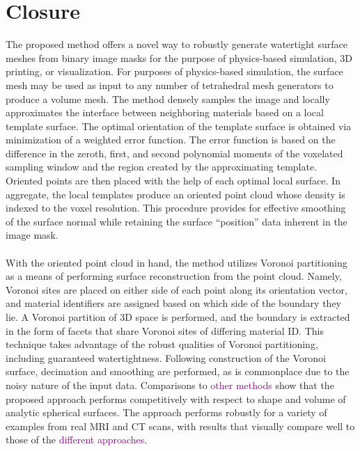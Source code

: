 \section{Closure}

The proposed method offers a novel way to robustly generate watertight surface meshes from binary image masks for the purpose of physics-based simulation, 3D printing, or visualization. For purposes of physics-based simulation, the surface mesh may be used as input to any number of tetrahedral mesh generators to produce a volume mesh. The method densely samples the image and locally approximates the interface between neighboring materials based on a local template surface. The optimal orientation of the template surface is obtained via minimization of a weighted error function. The error function is based on the difference in the zeroth, first, and second polynomial moments of the voxelated sampling window and the region created by the approximating template. Oriented points are then placed with the help of each optimal local surface. In aggregate, the local templates produce an oriented point cloud whose density is indexed to the voxel resolution. This procedure provides for effective smoothing of the surface normal while retaining the surface ``position'' data inherent in the image mask. \\ \\
%
With the oriented point cloud in hand, the method utilizes Voronoi partitioning as a means of performing surface reconstruction from the point cloud. Namely, Voronoi sites are placed on either side of each point along its orientation vector, and material identifiers are assigned based on which side of the boundary they lie. A Voronoi partition of 3D space is performed, and the boundary is extracted in the form of facets that share Voronoi sites of differing material ID. This technique takes advantage of the robust qualities of Voronoi partitioning, including guaranteed watertightness. Following construction of the Voronoi surface, decimation and smoothing are performed, as is commonplace due to the noisy nature of the input data. Comparisons to \textcolor{purple}{other methods} show that the proposed approach performs competitively with respect to shape and volume of analytic spherical surfaces. The approach performs robustly for a variety of examples from real MRI and CT scans, with results that visually compare well to those of the \textcolor{purple}{different approaches}. \\ \\
%
